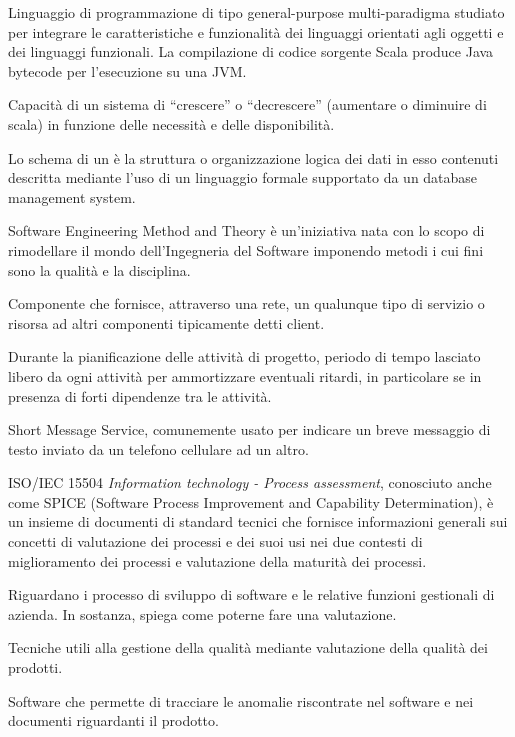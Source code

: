 
Linguaggio di programmazione di tipo general-purpose multi-paradigma studiato per integrare le caratteristiche e funzionalità dei linguaggi orientati agli oggetti e dei linguaggi funzionali. La compilazione di codice sorgente Scala produce Java bytecode per l'esecuzione su una JVM.

Capacità di un sistema di ``crescere'' o ``decrescere'' (aumentare o diminuire di scala) in funzione delle necessità e delle disponibilità.

Lo schema di un  è la struttura o organizzazione logica dei dati in esso contenuti descritta mediante l'uso di un linguaggio formale supportato da un database management system.

Software Engineering Method and Theory è un'iniziativa nata con lo scopo di rimodellare il mondo dell'Ingegneria del Software imponendo metodi i cui fini sono la qualità e la disciplina.

Componente che fornisce, attraverso una rete, un qualunque tipo di servizio o risorsa ad altri componenti tipicamente detti client.

Durante la pianificazione delle attività di progetto, periodo di tempo lasciato libero da ogni attività per ammortizzare eventuali ritardi, in particolare se in presenza di forti dipendenze tra le attività.

Short Message Service, comunemente usato per indicare un breve messaggio di testo inviato da un telefono cellulare ad un altro.

ISO/IEC 15504 \emph{Information technology - Process assessment}, conosciuto anche come SPICE (Software Process Improvement and Capability Determination), è un insieme di documenti di standard tecnici che fornisce informazioni generali sui concetti di valutazione dei processi e dei suoi usi nei due contesti di miglioramento dei processi e valutazione della maturità dei processi.

Riguardano i processo di sviluppo di software e le relative funzioni gestionali di azienda. In sostanza, spiega come poterne fare una valutazione.

Tecniche utili alla gestione della qualità mediante valutazione della qualità dei prodotti.

Software che permette di tracciare le anomalie riscontrate nel software e nei documenti riguardanti il prodotto.

